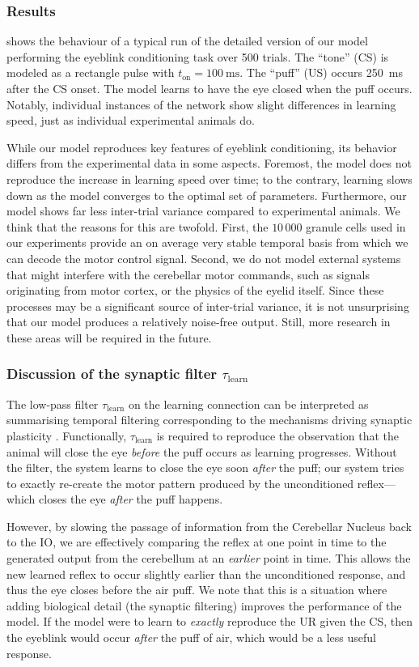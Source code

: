 \subsubsection{Results}
 shows the behaviour of a typical run of the detailed version of our model performing the eyeblink conditioning task over 500 trials.
The \enquote{tone} (CS) is modeled as a rectangle pulse with $t_\mathrm{on} = \SI{100}{\milli\second}$.
The \enquote{puff} (US) occurs \SI{250}{\milli\second} after the CS onset.
The model learns to have the eye closed when the puff occurs. Notably, individual instances of the network show slight differences in learning speed, just as individual experimental animals do.

While our model reproduces key features of eyeblink conditioning, its behavior differs from the experimental data in some aspects.
Foremost, the model does not reproduce the increase in learning speed over time; to the contrary, learning slows down as the model converges to the optimal set of parameters.
Furthermore, our model shows far less inter-trial variance compared to experimental animals.
We think that the reasons for this are twofold.
First, the $10\,000$ granule cells used in our experiments provide an on average very stable temporal basis from which we can decode the motor control signal.
Second, we do not model external systems that might interfere with the cerebellar motor commands, such as signals originating from motor cortex, or the physics of the eyelid itself.
Since these processes may be a significant source of inter-trial variance, it is not unsurprising that our model produces a relatively noise-free output.
Still, more research in these areas will be required in the future.


\subsubsection{Discussion of the synaptic filter $\tau_\mathrm{learn}$}
The low-pass filter $\tau_\mathrm{learn}$ on the learning connection can be interpreted as summarising temporal filtering corresponding to the mechanisms driving synaptic plasticity \citep[e.g.,][Chapter~66]{kandel2012principles}.
Functionally, $\tau_\mathrm{learn}$ is required to reproduce the observation that the animal will close the eye \emph{before} the puff occurs as learning progresses.
Without the filter, the system learns to close the eye soon \emph{after} the puff; our system tries to exactly re-create the motor pattern produced by the unconditioned reflex---which closes the eye \emph{after} the puff happens.

However, by slowing the passage of information from the Cerebellar Nucleus back to the IO, we are effectively comparing the reflex at one point in time to the generated output from the cerebellum at an \emph{earlier} point in time.
This allows the new learned reflex to occur slightly earlier than the unconditioned response, and thus the eye closes before the air puff.
We note that this is a situation where adding biological detail (the synaptic filtering) improves the performance of the model.
If the model were to learn to \textit{exactly} reproduce the UR given the CS, then the eyeblink would occur \textit{after} the puff of air, which would be a less useful response.